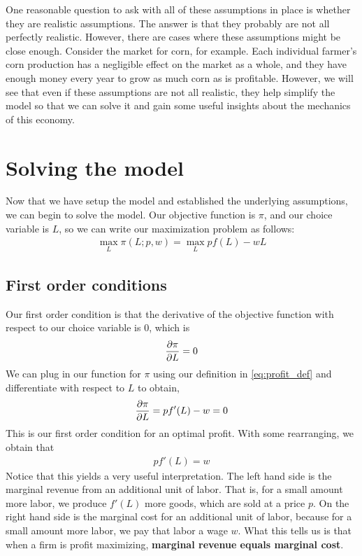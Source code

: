 One reasonable question to ask with all of these assumptions in place is whether they are realistic assumptions. The answer is that they probably are not all perfectly realistic. However, there are cases where these assumptions might be close enough. Consider the market for corn, for example. Each individual farmer's corn production has a negligible effect on the market as a whole, and they have enough money every year to grow as much corn as is profitable. However, we will see that even if these assumptions are not all realistic, they help simplify the model so that we can solve it and gain some useful insights about the mechanics of this economy. 

\section{Solving the model} \label{sec:solving_model}
Now that we have setup the model and established the underlying assumptions, we can begin to solve the model. Our objective function is $\pi$, and our choice variable is $L$, so we can write our maximization problem as follows:
\begin{align}
    \max_{L} \pi(L; p, w) = \max_{L} p f(L) - w L
\end{align}

\subsection*{First order conditions}
Our first order condition is that the derivative of the objective function with respect to our choice variable is 0, which is
\begin{align}
    \frac{\partial \pi}{\partial L} = 0 \label{eq:profit_foc}
\end{align}
We can plug in our function for $\pi$ using our definition in \ref{eq:profit_def} and differentiate with respect to $L$ to obtain,
\begin{align}
    \frac{\partial \pi}{\partial L} = p f'(L) - w = 0
\end{align}
This is our first order condition for an optimal profit. With some rearranging, we obtain that
\begin{align}
    p f'(L) = w 
\end{align}
Notice that this yields a very useful interpretation. The left hand side is the marginal revenue from an additional unit of labor. That is, for a small amount more labor, we produce $f'(L)$ more goods, which are sold at a price $p$. On the right hand side is the marginal cost for an additional unit of labor, because for a small amount more labor, we pay that labor a wage $w$. What this tells us is that when a firm is profit maximizing, \textbf{marginal revenue equals marginal cost}. 

